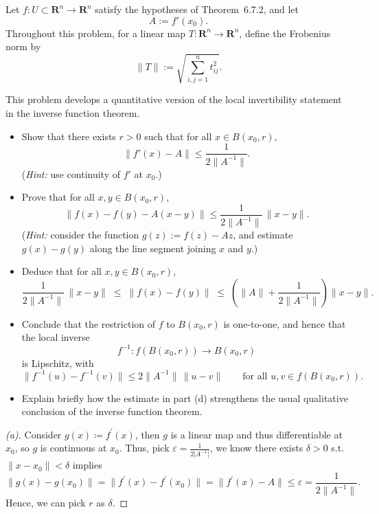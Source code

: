 \begin{problem}
    Let \(f:U\subset \mathbf{R}^n\to \mathbf{R}^n\) satisfy the hypotheses of Theorem~6.7.2, and let
    $$
    A:=f'(x_0).
    $$
    Throughout this problem, for a linear map \(T:\mathbf{R}^n\to \mathbf{R}^n\), define the Frobenius norm by
    $$
    \|T\|:=\sqrt{\sum_{i,j=1}^n t_{ij}^2}.
    $$
    
    This problem develops a quantitative version of the local invertibility statement in the inverse function theorem.
    
    \begin{itemize}
    \item[(a)] Show that there exists \(r>0\) such that for all \(x\in B(x_0,r)\),
    $$
    \|f'(x)-A\|\le \frac{1}{2\|A^{-1}\|}.
    $$
    (\emph{Hint:} use continuity of \(f'\) at \(x_0\).)
    
    \item[(b)] Prove that for all \(x,y\in B(x_0,r)\),
    $$
    \|f(x)-f(y)-A(x-y)\|
    \le
    \frac{1}{2\|A^{-1}\|}\,\|x-y\|.
    $$
    (\emph{Hint:} consider the function \(g(z):=f(z)-Az\), and estimate \(g(x)-g(y)\) along the line segment joining \(x\) and \(y\).)
    
    \item[(c)] Deduce that for all \(x,y\in B(x_0,r)\),
    $$
    \frac{1}{2\|A^{-1}\|}\,\|x-y\|
    \;\le\;
    \|f(x)-f(y)\|
    \;\le\;
    \left(\|A\|+\frac{1}{2\|A^{-1}\|}\right)\|x-y\|.
    $$
    
    \item[(d)] Conclude that the restriction of \(f\) to \(B(x_0,r)\) is one-to-one, and hence that the local inverse
    $$
    f^{-1}:f(B(x_0,r))\to B(x_0,r)
    $$
    is Lipschitz, with
    $$
    \|f^{-1}(u)-f^{-1}(v)\|
    \le
    2\|A^{-1}\|\,\|u-v\|
    \qquad
    \text{for all }u,v\in f(B(x_0,r)).
    $$
    
    \item[(e)] Explain briefly how the estimate in part (d) strengthens the usual qualitative conclusion of the inverse function theorem.
    \end{itemize}
\end{problem}
\begin{proof}[(a)]
    Consider \(g(x) \coloneqq f^{\prime} (x)\), then \(g\) is a linear map and thus differentiable at \(x_0\), so \(g\) is continuous at \(x_0\). Thus, pick \(\varepsilon = \frac{1}{2 \vert A^{-1} \vert }\), we know there exists \(\delta > 0\) s.t. \(\lVert x - x_0 \rVert < \delta  \) implies
    \[
        \lVert g(x) - g(x_0) \rVert = \lVert f^{\prime} (x) - f^{\prime} (x_0) \rVert = \lVert f^{\prime} (x) - A \rVert  \le \varepsilon = \frac{1}{2 \lVert A^{-1} \rVert}.
    \]
    Hence, we can pick \(r\) as \(\delta \).         
\end{proof}

